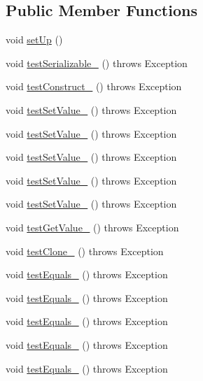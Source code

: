\subsection*{Public Member Functions}
\begin{DoxyCompactItemize}
\item 
void \hyperlink{classorg_1_1jgap_1_1audit_1_1_keyed_values2_d_test_a3e14437862b02057edf171f9b0d17331}{set\-Up} ()
\item 
void \hyperlink{classorg_1_1jgap_1_1audit_1_1_keyed_values2_d_test_a50ee3a3cdd98c633d42bbdf9fbfef9d9}{test\-Serializable\-\_} ()  throws Exception 
\item 
void \hyperlink{classorg_1_1jgap_1_1audit_1_1_keyed_values2_d_test_a5c09806b2fa34b7ec8c580043ad38259}{test\-Construct\-\_} ()  throws Exception 
\item 
void \hyperlink{classorg_1_1jgap_1_1audit_1_1_keyed_values2_d_test_ab6f25a12c3be3e6c966d7da74a1d76fb}{test\-Set\-Value\-\_} ()  throws Exception 
\item 
void \hyperlink{classorg_1_1jgap_1_1audit_1_1_keyed_values2_d_test_af9598a23d88a39c1e95b1695accde833}{test\-Set\-Value\-\_} ()  throws Exception 
\item 
void \hyperlink{classorg_1_1jgap_1_1audit_1_1_keyed_values2_d_test_a165def2ace6b8580d29e55c84da51bc9}{test\-Set\-Value\-\_} ()  throws Exception 
\item 
void \hyperlink{classorg_1_1jgap_1_1audit_1_1_keyed_values2_d_test_ac0b9e2feb424f5b5257eb3e1b483b95f}{test\-Set\-Value\-\_} ()  throws Exception 
\item 
void \hyperlink{classorg_1_1jgap_1_1audit_1_1_keyed_values2_d_test_ac7da5eafb21c6955504df38ad568881a}{test\-Set\-Value\-\_} ()  throws Exception 
\item 
void \hyperlink{classorg_1_1jgap_1_1audit_1_1_keyed_values2_d_test_a94b0fcf61d48c901a5d8414fd8bc0ccf}{test\-Get\-Value\-\_} ()  throws Exception 
\item 
void \hyperlink{classorg_1_1jgap_1_1audit_1_1_keyed_values2_d_test_a3abcf4a2f6c3cc6cd3c6498b7bfaaba5}{test\-Clone\-\_} ()  throws Exception 
\item 
void \hyperlink{classorg_1_1jgap_1_1audit_1_1_keyed_values2_d_test_a256bc5abcfd5a9e4c6c3be0ecf14890d}{test\-Equals\-\_} ()  throws Exception 
\item 
void \hyperlink{classorg_1_1jgap_1_1audit_1_1_keyed_values2_d_test_a566c78fee82ebcf0ac4e87e1a4ff8d3f}{test\-Equals\-\_} ()  throws Exception 
\item 
void \hyperlink{classorg_1_1jgap_1_1audit_1_1_keyed_values2_d_test_ab80815c9172478d2d3fba3b10fb9d26e}{test\-Equals\-\_} ()  throws Exception 
\item 
void \hyperlink{classorg_1_1jgap_1_1audit_1_1_keyed_values2_d_test_ab0a56ded8f83d13804290754d5f65af6}{test\-Equals\-\_} ()  throws Exception 
\item 
void \hyperlink{classorg_1_1jgap_1_1audit_1_1_keyed_values2_d_test_ae233b5053457b37887a4375c866ebde1}{test\-Equals\-\_} ()  throws Exception 
\end{DoxyCompactItemize}
